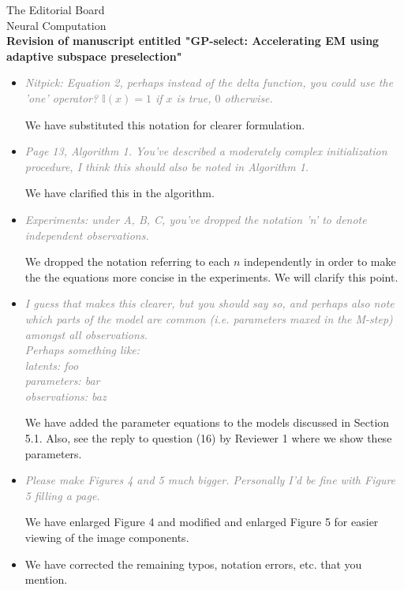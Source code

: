 \documentclass[10pt]{letter}
\newcommand{\rvr}[1]{\textcolor{gray}{#1}}
\begin{document}
\begin{letter}{
The Editorial Board\\
Neural Computation\\
\vspace{10mm}
\textbf{Revision of manuscript entitled "GP-select: Accelerating EM using adaptive
subspace preselection"}
}
\begin{itemize}[topsep=3pt,itemsep=2ex,partopsep=1ex,parsep=1ex]
    Please see our reply to Reviewer 1 above, point (5), who voiced the same confusion.    

    We have clarified and rewritten this sentence to read: \\
    "Even when the probability mass is supported everywhere, it may still be largely concentrated on a small number of the latents."

    \item \rvr{\emph{Nitpick: Equation 2, perhaps instead of the delta function, you could use
the 'one' operator? $\mathbb{I}(x) = 1$ if $x$ is true, $0$ otherwise.}}

    We have substituted this notation for clearer formulation.


    \item \rvr{\emph{Page 13, Algorithm 1. You've described a moderately complex initialization procedure, I think this should also be noted in Algorithm 1.}}

We have clarified this in the algorithm.

    \item \rvr{\emph{Experiments: under A, B, C, you've dropped the notation 'n' to denote independent observations.}}

    We dropped the notation referring to each $n$ independently in order to make the the equations more concise in the experiments. We will clarify this point.

    \item \rvr{\emph{I guess that makes this clearer, but you should say so, and perhaps also note which parts of the model are common (i.e. parameters maxed in the M-step) amongst all observations.  \\
Perhaps something like:\\
latents: foo \\
parameters: bar\\
observations: baz}}

    We have added the parameter equations to the models discussed in Section 5.1. Also, see the reply to question (16) by Reviewer 1 where we show these parameters.


    \item \rvr{\emph{Please make Figures 4 and 5 much bigger. Personally I'd be fine with Figure 5 filling a page.}}

        We have enlarged Figure 4 and modified and enlarged Figure 5 for easier viewing of the image components.

    \item We have corrected the remaining typos, notation errors, etc. that you mention.
    




\end{itemize}
\end{letter}
\end{document}
